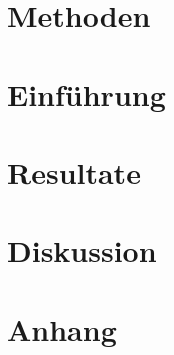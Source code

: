 \documentclass[12pt, a4paper, twoside]{report}
\title{}
\author{}
\date{\today}
\begin{document}
 



 
\renewcommand{\contentsname}{Inhaltsverzeichnis}
\renewcommand{\listfigurename}{Abbildungsverzeichnis}

\renewcommand{\listtablename}{Tabellenverzeichnis}

\renewcommand{\figurename}{Abbildung}
\tableofcontents



\printglossary[title=Glossar, toctitle=Glossar]
\chapter{Methoden}


\chapter{Einführung}


\chapter{Resultate}


\chapter{Diskussion}


\listoffigures

\listoftables

\appendix
\chapter{Anhang}



\printbibliography[title={Literaturverzeichnis}, heading=bibintoc]
\end{document}
